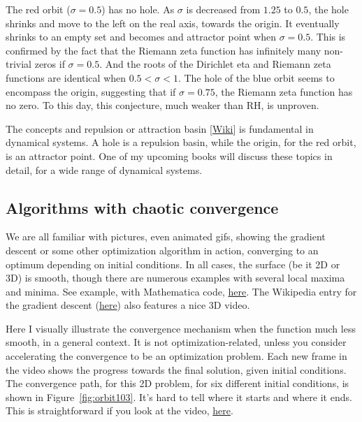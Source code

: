 \documentclass[oneside,10pt]{book}
\begin{document}
The red orbit ($\sigma=0.5$) has no hole. As $\sigma$ is decreased from $1.25$ to $0.5$, the hole shrinks and move to the left on the real axis, towards the origin. It eventually shrinks
to an empty set and becomes and attractor point when $\sigma=0.5$. This is confirmed by the fact that the Riemann zeta function has infinitely many non-trivial zeros if $\sigma=0.5$. And the roots of the Dirichlet eta and Riemann zeta functions are identical when $0.5 < \sigma < 1$. The hole of the blue orbit seems to
encompass the origin, suggesting that if $\sigma=0.75$, the Riemann zeta function has no zero. To this day, this conjecture, much weaker than RH, is unproven.

The concepts and repulsion or \textcolor{index}{attraction basin} [\href{https://en.wikipedia.org/wiki/Attractor}{Wiki}] is fundamental in dynamical systems.
A hole is a repulsion basin, while the origin, for the red orbit, is an attractor point. One of my upcoming books will discuss these topics in detail, for a wide
range of dynamical systems.

\subsection{Algorithms with chaotic convergence}\label{psr55}

We are all familiar with pictures, even animated gifs, showing the gradient descent or some other optimization algorithm in action, converging to an optimum depending on initial conditions. In all cases, the surface (be it 2D or 3D) is smooth, though there are numerous examples with several local maxima and minima. See example, with Mathematica code, \href{https://commons.wikimedia.org/wiki/File:Gradient_descent.gif}{here}. The Wikipedia entry for the gradient descent
(\href{https://en.wikipedia.org/wiki/Gradient_descent}{here}) also features a nice 3D video.

Here I visually illustrate the convergence mechanism when the function much less smooth, in a general context. It is not optimization-related, unless you consider
accelerating the convergence to be an optimization problem. Each new frame in the video shows the progress towards the final solution, given initial conditions. The convergence path, for this 2D problem, for six different initial conditions, is shown in Figure~\ref{fig:orbit103}.
It's hard to tell where it starts and where it ends. This is straightforward if you look at the video, \href{https://www.youtube.com/watch?v=XI5MhyNc7us}{here}.
\end{document}
